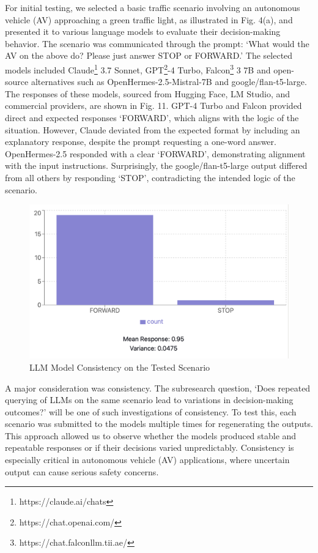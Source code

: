 \documentclass[conference]{IEEEtran}
\begin{document}
For initial testing, we selected a basic traffic scenario involving an autonomous vehicle (AV) approaching a green traffic light, as illustrated in Fig. 4(a), and presented it to various language models to evaluate their decision-making behavior. The scenario was communicated through the prompt: `What would the AV on the above do? Please just answer STOP or FORWARD.' The selected models included Claude\footnote{https://claude.ai/chats} 3.7 Sonnet, GPT\footnote{https://chat.openai.com/}-4 Turbo, Falcon\footnote{https://chat.falconllm.tii.ae/} 3 7B and open-source alternatives such as OpenHermes-2.5-Mistral-7B and google/flan-t5-large. The responses of these models, sourced from Hugging Face, LM Studio, and commercial providers, are shown in Fig. 11. GPT-4 Turbo and Falcon provided direct and expected responses `FORWARD', which aligns with the logic of the situation. However, Claude deviated from the expected format by including an explanatory response, despite the prompt requesting a one-word answer. OpenHermes-2.5 responded with a clear `FORWARD', demonstrating alignment with the input instructions. Surprisingly, the google/flan-t5-large output differed from all others by responding `STOP', contradicting the intended logic of the scenario.

 \begin{figure}[b]
     \centering
     \includegraphics[width=\linewidth]{Fig/chart.png}
     \caption{LLM Model Consistency on the Tested Scenario}
     \label{fig:enter-label}
 \end{figure}
 
A major consideration was consistency. The subresearch question, `Does repeated querying of LLMs on the same scenario lead to variations in decision-making outcomes?'  will be one of such investigations of consistency.  To test this, each scenario was submitted to the models multiple times for regenerating the outputs. This approach allowed us to observe whether the models produced stable and repeatable responses or if their decisions varied unpredictably. Consistency is especially critical in autonomous vehicle (AV) applications, where uncertain output can cause serious safety concerns. 
\end{document}
